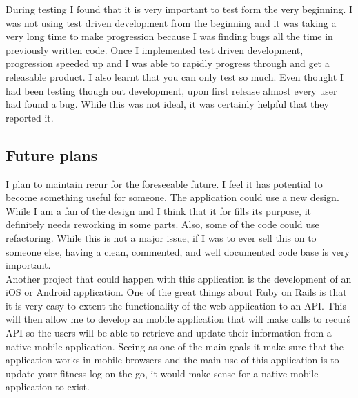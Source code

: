 During testing I found that it is very important to test form the very beginning. I was not using test driven development from the beginning and it was taking a very long time to make progression because I was finding bugs all the time in previously written code. Once I implemented test driven development, progression speeded up and I was able to rapidly progress through and get a releasable product. I also learnt that you can only test so much. Even thought I had been testing though out development, upon first release almost every user had found a bug. While this was not ideal, it was certainly helpful that they reported it.\\

\subsection{Future plans}
I plan to maintain recur for the foreseeable future. I feel it has potential to become something useful for someone. The application could use a new design. While I am a fan of the design and I think that it for fills its purpose, it definitely needs reworking in some parts. Also, some of the code could use refactoring. While this is not a major issue, if I was to ever sell this on to someone else, having a clean, commented, and well documented code base is very important. \\

Another project that could happen with this application is the development of an iOS or Android application. One of the great things about Ruby on Rails is that it is very easy to extent the functionality of the web application to an API. This will then allow me to develop an mobile application that will make calls to recur\'s API so the users will be able to retrieve and update their information from a native mobile application. Seeing as one of the main goals it make sure that the application works in mobile browsers and the main use of this application is to update your fitness log on the go, it would make sense for a native mobile application to exist. 